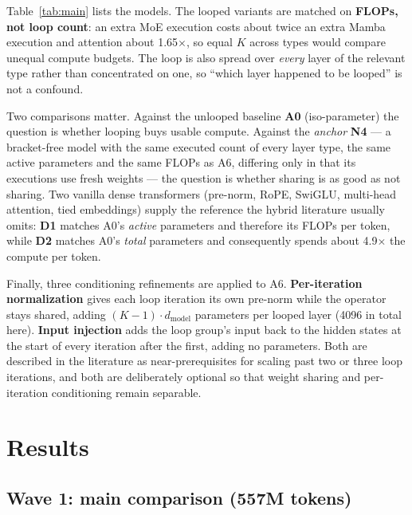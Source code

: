 \documentclass[11pt,a4paper]{article}
\begin{document}
Table~\ref{tab:main} lists the models. The looped variants are matched on \textbf{FLOPs, not loop
count}: an extra MoE execution costs about twice an extra Mamba execution and attention about
1.65$\times$, so equal $K$ across types would compare unequal compute budgets. The loop is also
spread over \emph{every} layer of the relevant type rather than concentrated on one, so ``which
layer happened to be looped'' is not a confound.

Two comparisons matter. Against the unlooped baseline \textbf{A0} (iso-parameter) the question is
whether looping buys usable compute. Against the \emph{anchor} \textbf{N4} --- a bracket-free model
with the same executed count of every layer type, the same active parameters and the same FLOPs as
A6, differing only in that its executions use fresh weights --- the question is whether sharing is
as good as not sharing. Two vanilla dense transformers (pre-norm, RoPE, SwiGLU, multi-head
attention, tied embeddings) supply the reference the hybrid literature usually omits: \textbf{D1}
matches A0's \emph{active} parameters and therefore its FLOPs per token, while \textbf{D2} matches
A0's \emph{total} parameters and consequently spends about 4.9$\times$ the compute per token.

Finally, three conditioning refinements are applied to A6. \textbf{Per-iteration normalization}
gives each loop iteration its own pre-norm while the operator stays shared, adding $(K-1) \cdot
d_{\text{model}}$ parameters per looped layer (4096 in total here). \textbf{Input injection} adds
the loop group's input back to the hidden states at the start of every iteration after the first,
adding no parameters. Both are described in the literature as near-prerequisites for scaling past
two or three loop iterations, and both are deliberately optional so that weight sharing and
per-iteration conditioning remain separable.

\section{Results}

\subsection{Wave 1: main comparison (557M tokens)}
\end{document}
